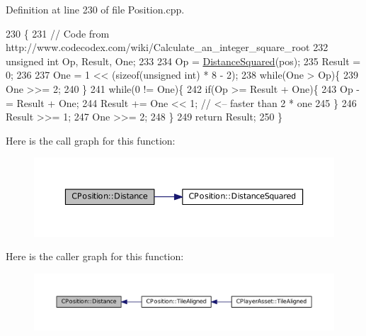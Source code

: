 Definition at line 230 of file Position.\+cpp.


\begin{DoxyCode}
230                                            \{
231     \textcolor{comment}{// Code from http://www.codecodex.com/wiki/Calculate\_an\_integer\_square\_root}
232     \textcolor{keywordtype}{unsigned} \textcolor{keywordtype}{int} Op, Result, One;
233     
234     Op = \hyperlink{classCPosition_acd96d507f44c0fdf13036ebc1a09e59c}{DistanceSquared}(pos);
235     Result = 0;
236     
237     One = 1 << (\textcolor{keyword}{sizeof}(\textcolor{keywordtype}{unsigned} int) * 8 - 2);
238     \textcolor{keywordflow}{while}(One > Op)\{
239         One >>= 2;
240     \}
241     \textcolor{keywordflow}{while}(0 != One)\{
242         \textcolor{keywordflow}{if}(Op >= Result + One)\{
243             Op -= Result + One;  
244             Result += One << 1;  \textcolor{comment}{// <-- faster than 2 * one  }
245         \}
246         Result >>= 1;
247         One >>= 2;
248     \}
249     \textcolor{keywordflow}{return} Result;    
250 \}
\end{DoxyCode}
Here is the call graph for this function\+:
\nopagebreak
\begin{figure}[H]
\begin{center}
\leavevmode
\includegraphics[width=350pt]{classCPosition_a9edc6690c78a54ea08b137df83c22e91_cgraph}
\end{center}
\end{figure}
Here is the caller graph for this function\+:
\nopagebreak
\begin{figure}[H]
\begin{center}
\leavevmode
\includegraphics[width=350pt]{classCPosition_a9edc6690c78a54ea08b137df83c22e91_icgraph}
\end{center}
\end{figure}
\hypertarget{classCPosition_acd96d507f44c0fdf13036ebc1a09e59c}{}\label{classCPosition_acd96d507f44c0fdf13036ebc1a09e59c} 
